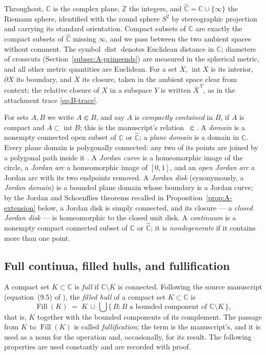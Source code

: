 \documentclass[11pt,reqno]{amsart}
\theoremstyle{definition}
\theoremstyle{remark}
\newcommand{\C}{\mathbb C}
\newcommand{\Z}{\mathbb Z}
\newcommand{\Chat}{\widehat{\mathbb C}}
\newcommand{\Fill}{\operatorname{Fill}}
\newcommand{\Int}{\operatorname{int}}
\newcommand{\dist}{\operatorname{dist}}
\begin{document}
Throughout, $\C$ is the complex plane, $\Z$ the integers, and
$\Chat=\C\cup\{\infty\}$ the Riemann sphere, identified with the round
sphere $S^2$ by stereographic projection and carrying its standard
orientation.  Compact subsets of $\C$ are exactly the compact subsets of
$\Chat$ missing $\infty$, and we pass between the two ambient spaces
without comment.  The symbol $\dist$ denotes Euclidean distance in $\C$;
diameters of crosscuts (Section~\ref{subsec:A-primeends}) are measured in
the spherical metric, and all other metric quantities are Euclidean.  For
a set $X$, $\Int X$ is its interior, $\partial X$ its boundary, and
$\overline{X}$ its closure, taken in the ambient space clear from context;
the relative closure of $X$ in a subspace $Y$ is written
$\overline{X}^{\,Y}$, as in the attachment trace \eqref{eq:B-trace}.

For sets $A,B$ we write $A\Subset B$, and say $A$ is \emph{compactly
contained} in $B$, if $\overline{A}$ is compact and
$\overline{A}\subset\Int B$; this is the manuscript's relation~$\Subset$.
A \emph{domain} is a nonempty connected open subset of $\C$ or $\Chat$; a
\emph{plane domain} is a domain in $\C$.  Every plane domain is polygonally
connected: any two of its points are joined by a polygonal path inside it
\cite{New51}.  A \emph{Jordan curve} is a homeomorphic image of the circle,
a \emph{Jordan arc} a homeomorphic image of $[0,1]$, and an \emph{open
Jordan arc} a Jordan arc with its two endpoints removed.  A \emph{Jordan
disk} (synonymously, a \emph{Jordan domain}) is a bounded plane domain
whose boundary is a Jordan curve; by the Jordan and Schoenflies theorems
recalled in Proposition~\ref{prop:A-extension} below, a Jordan disk is
simply connected, and its closure --- a \emph{closed Jordan disk} --- is
homeomorphic to the closed unit disk.  A \emph{continuum} is a nonempty
compact connected subset of $\C$ or $\Chat$; it is \emph{nondegenerate} if
it contains more than one point.

\subsection{Full continua, filled hulls, and fullification}
\label{subsec:A-full}

A compact set $K\subset\C$ is \emph{full} if $\C\setminus K$ is connected.
Following the source manuscript (equation~(9.5) of \cite{MWman}), the
\emph{filled hull} of a compact set $K\subset\C$ is
\begin{equation}\label{eq:A-fill}
\Fill(K)\;=\;K\,\cup\,
\bigcup\bigl\{\,B : B \text{ a bounded component of }\C\setminus K\,\bigr\},
\end{equation}
that is, $K$ together with the bounded components of its complement.  The
passage from $K$ to $\Fill(K)$ is called \emph{fullification}; the term is
the manuscript's, and it is used as a noun for the operation and,
occasionally, for its result.  The following properties are used
constantly and are recorded with proof.
\end{document}
